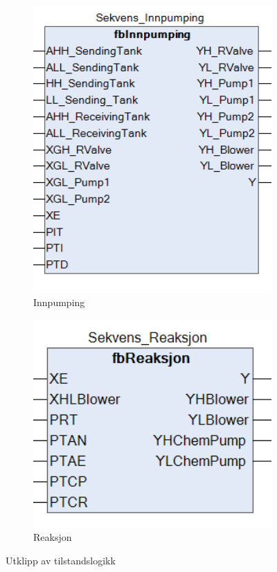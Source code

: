 \begin{figure}[htbp]
    \centering
    \begin{subfigure}[b]{0.3\textwidth}
        \centering
        \includegraphics[width=1\textwidth]{Bilder/fbInnpumping.png}
        \caption{Innpumping}\label{fig:subfig1}
    \end{subfigure}
    \hfill
    \begin{subfigure}[b]{0.3\textwidth}
        \centering
        \includegraphics[width=1\textwidth]{Bilder/fbReaksjon.png}
        \caption{Reaksjon}\label{fig:subfig2}
    \end{subfigure}
    \caption{Utklipp av tilstandslogikk}\label{fig:Illustrasjon-Diffuser}
\end{figure}



